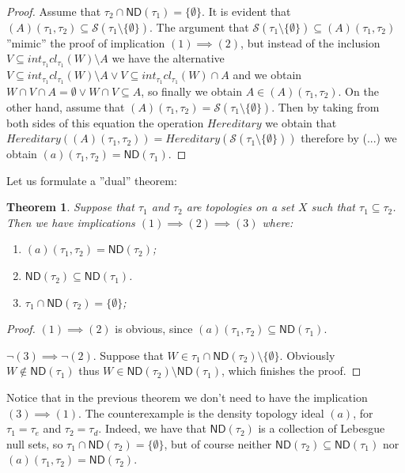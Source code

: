 \documentclass[12pt]{amsart}
\theoremstyle{plain}
\newtheorem{theorem}{Theorem}[section]
\theoremstyle{definition}
\theoremstyle{remark}
\newcommand{\cl}{\mathit{cl}}
\newcommand{\cS}{{\mathcal S}}
\newcommand{\mathint}{\mathit{int}}
\newcommand{\aideal}{\mathit{(a)}}
\newcommand{\Afield}{\mathit{(A)}}
\begin{document}
\begin{proof}
Assume that $\tau_2 \cap \mathsf{ND}(\tau_1) = \lbrace \emptyset \rbrace$.
It is evident that $\Afield(\tau_1, \tau_2) \subseteq \cS(\tau_1 \setminus \lbrace \emptyset \rbrace)$.
The argument that $\cS(\tau_1 \setminus \lbrace \emptyset \rbrace)\subseteq \Afield(\tau_1, \tau_2)$
''mimic'' the proof of implication $(1) \implies (2)$, but instead of the inclusion
$V \subseteq \mathint_{\tau_1} \cl_{\tau_1} (W) \setminus A$ we have the alternative
$V \subseteq \mathint_{\tau_1} \cl_{\tau_1} (W) \setminus A \vee V \subseteq \mathint_{\tau_1} \cl_{\tau_1} (W) \cap A$ 
and  we obtain $W \cap V \cap A = \emptyset \vee W \cap V \subseteq A$, so finally we
obtain $A \in \Afield(\tau_1, \tau_2)$.
On the other hand, assume that 
$\Afield(\tau_1, \tau_2) = \cS(\tau_1 \setminus \lbrace \emptyset \rbrace)$. 
Then by taking from both sides of this equation the operation $\mathit{Hereditary}$
we obtain that 
$\mathit{Hereditary}(\Afield(\tau_1, \tau_2)) = \mathit{Hereditary}(\cS(\tau_1 \setminus \lbrace \emptyset \rbrace))$
therefore by (...) we obtain
$\aideal(\tau_1, \tau_2) = \mathsf{ND}(\tau_1)$.
\end{proof}

Let us formulate a ''dual'' theorem:

\begin{theorem}
Suppose that $\tau_1$ and $\tau_2$ are topologies on a set $X$ such
that $\tau_1 \subseteq \tau_2$.
Then we have implications $(1) \implies (2) \implies (3)$
where:
\begin{enumerate}
\item $\aideal(\tau_1, \tau_2) = \mathsf{ND}(\tau_2)$;
\item $\mathsf{ND}(\tau_2) \subseteq \mathsf{ND}(\tau_1)$.
\item $\tau_1 \cap \mathsf{ND}(\tau_2) = \lbrace \emptyset \rbrace$;
\end{enumerate}
\end{theorem}

\begin{proof}
$(1)\implies (2)$ is obvious, since
$\aideal(\tau_1, \tau_2) \subseteq \mathsf{ND}(\tau_1)$.

$\neg(3)\implies \neg(2)$.
Suppose that $W\in\tau_1\cap\mathsf{ND}(\tau_2) \setminus \lbrace\emptyset\rbrace$.
Obviously $W\not\in\mathsf{ND}(\tau_1)$ thus
$W \in \mathsf{ND}(\tau_2) \setminus \mathsf{ND}(\tau_1)$,
which finishes the proof.
\end{proof}

Notice that in the previous theorem we don't need to have
the implication $(3) \implies (1)$. The counterexample 
is the density topology ideal $\aideal$, for $\tau_1 = \tau_e$
and $\tau_2 = \tau_d$. Indeed, we have 
that $\mathsf{ND}(\tau_2)$ is a collection of Lebesgue null sets, 
so $\tau_1 \cap \mathsf{ND}(\tau_2) = \lbrace \emptyset \rbrace$,
but of course neither $\mathsf{ND}(\tau_2) \subseteq \mathsf{ND}(\tau_1)$ 
nor $\aideal(\tau_1, \tau_2) = \mathsf{ND}(\tau_2)$.
\end{document}
